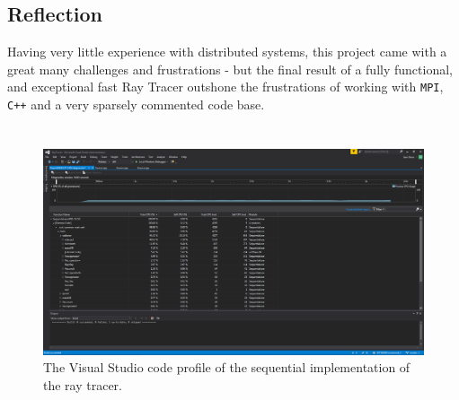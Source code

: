 \documentclass[journal,transmag]{IEEEtran}
\begin{document}
	\subsection{Reflection}
	Having very little experience with distributed systems, this project came with a great many challenges and frustrations - but the final result of a fully functional, and exceptional fast Ray Tracer outshone the frustrations of working with \texttt{MPI}, \texttt{C++} and a very sparsely commented code base.




\newpage
\onecolumn
\appendices

\section{}
\begin{figure}[h]
	\centering
	\includegraphics[width =\textwidth]{sequentialProfile}
	\caption{The Visual Studio code profile of the sequential implementation of the ray tracer.}
	\label{fig_seq_prfile}
\end{figure}
\end{document}
